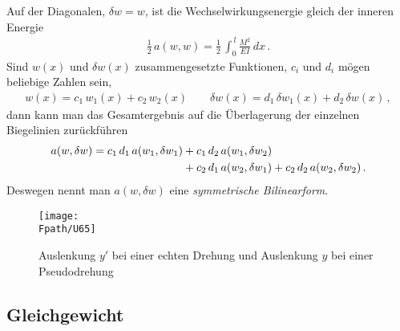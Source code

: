 {{{{{Auf der Diagonalen, $\delta w = w$, ist die Wechselwirkungsenergie gleich der inneren Energie
\begin{align}
\frac{1}{2}\, a(w,w) = \frac{1}{2}\, \int_0^{\,l} \frac{M^2}{EI}\,dx\,.
\end{align}
Sind $ w(x) $ und $ \delta w(x)$ zusammengesetzte Funktionen, $c_i$ und $d_i$ m\"{o}gen beliebige Zahlen sein,
\begin{align}
w(x)= c_1\,w_1(x) + c_2\,w_2(x) \qquad \delta w(x) = d_1\,\delta w_1(x) + d_2\,\delta w(x)\,,
\end{align}
dann kann man das Gesamtergebnis auf die \"{U}berlagerung der einzelnen Bie\-ge\-linien zur\"{u}ckf\"{u}hren
\begin{align}
a(w,\delta w) = c_1\,d_1\,a(w_1,\delta w_1) &+ c_1\,d_2\,a(w_1,\delta w_2)\nonumber \\
 &+ c_2\,d_1\,a(w_2,\delta w_1) + c_2\,d_2\,a(w_2,\delta w_2)\,.
\end{align}
Deswegen nennt man $ a(w,\delta w) $ eine {\em symmetrische Bilinearform\/}.

\begin{figure}[tbp]
\centering
\if {} \sidecaption \fi
\texttt{[image: \\Fpath/U65]}
\caption{Auslenkung $y'$ bei einer echten Drehung und Auslenkung $y$ bei einer Pseudodrehung} \label{U65}
\end{figure}

{\textcolor{sectionTitleBlue}{\section{Gleichgewicht}}}

}}}}}
